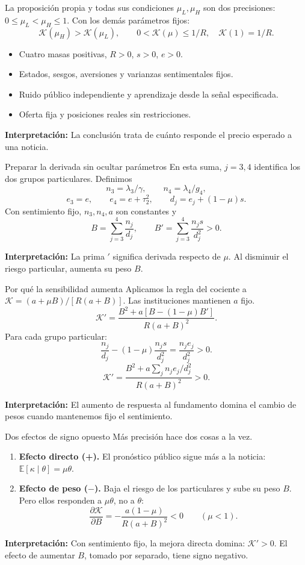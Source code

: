\documentclass[aspectratio=169,11pt]{beamer}
\newcommand{\E}{\mathbb E}
\newcommand{\K}{\mathcal K}
\newcommand{\idea}[1]{\par\medskip\textbf{Interpretación:} #1}
\begin{document}
\begin{frame}{La proposición propia y todas sus condiciones}
\(\mu_L,\mu_H\) son dos precisiones: \(0\leq\mu_L<\mu_H\leq1\).
Con los demás parámetros fijos:
\[
 \boxed{\K(\mu_H)>\K(\mu_L)},\qquad 0<\K(\mu)\leq1/R,\quad \K(1)=1/R.
\]
\begin{itemize}
\item Cuatro masas positivas, \(R>0\), \(s>0\), \(e>0\).
\item Estados, sesgos, aversiones y varianzas sentimentales fijos.
\item Ruido público independiente y aprendizaje desde la señal especificada.
\item Oferta fija y posiciones reales sin restricciones.
\end{itemize}
\idea{La conclusión trata de cuánto responde el precio esperado a una noticia.}
\end{frame}

\begin{frame}{Preparar la derivada sin ocultar parámetros}
En esta suma, \(j=3,4\) identifica los dos grupos particulares. Definimos
\[
n_3=\lambda_3/\gamma,\qquad n_4=\lambda_4/g_4,
\]
\[
e_3=e,\qquad e_4=e+\tau_2^2,\qquad d_j=e_j+(1-\mu)s.
\]
Con sentimiento fijo, \(n_3,n_4,a\) son constantes y
\[
B=\sum_{j=3}^4\frac{n_j}{d_j},\qquad
B'=\sum_{j=3}^4\frac{n_js}{d_j^2}>0.
\]
\idea{La prima \( '\) significa derivada respecto de \(\mu\).
Al disminuir el riesgo particular, aumenta su peso \(B\).}
\end{frame}

\begin{frame}{Por qué la sensibilidad aumenta}
Aplicamos la regla del cociente a \(\K=(a+\mu B)/[R(a+B)]\).
Las instituciones mantienen \(a\) fijo.
\[
 \K'=\frac{B^2+a[B-(1-\mu)B']}{R(a+B)^2}.
\]
Para cada grupo particular:
\[
 \frac{n_j}{d_j}-(1-\mu)\frac{n_js}{d_j^2}
 =\frac{n_je_j}{d_j^2}>0.
\]
\[
 \boxed{\K'=\frac{B^2+a\sum_j n_je_j/d_j^2}{R(a+B)^2}>0}.
\]
\idea{El aumento de respuesta al fundamento domina el cambio de pesos
cuando mantenemos fijo el sentimiento.}
\end{frame}

\begin{frame}{Dos efectos de signo opuesto}
Más precisión hace dos cosas a la vez.
\begin{enumerate}
\item \textbf{Efecto directo (+).} El pronóstico público sigue más a la
noticia: \(\E[\kappa\mid\theta]=\mu\theta\).
\item \textbf{Efecto de peso (\(-\)).} Baja el riesgo de los particulares y
sube su peso \(B\). Pero ellos responden a \(\mu\theta\), no a \(\theta\):
\[
 \frac{\partial\K}{\partial B}=-\frac{a(1-\mu)}{R(a+B)^2}<0
 \qquad(\mu<1).
\]
\end{enumerate}

\idea{Con sentimiento fijo, la mejora directa domina: \(\K'>0\).
El efecto de aumentar \(B\), tomado por separado, tiene signo negativo.}
\end{frame}
\end{document}
